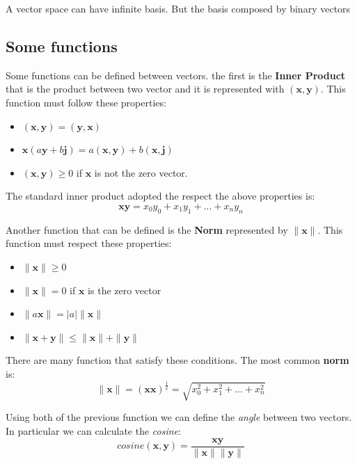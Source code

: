 \documentclass[12pt,a4paper,twoside,openright]{scrbook}
\begin{document}
A vector space can have infinite basis. But the basis composed by binary vectors

\subsection{Some functions}
Some functions can be defined between vectors. the first is the \textbf{Inner Product} that is the product between two vector and it is represented with $(\textbf{x}, \textbf{y})$. This function must follow these properties:
\begin{itemize}
\item $(\textbf{x}, \textbf{y}) = (\textbf{y}, \textbf{x})$ 
\item $\textbf{x} (a \textbf{y} + b \textbf{j}) = a(\textbf{x}, \textbf{y}) + b(\textbf{x}, \textbf{j})$
\item $(\textbf{x}, \textbf{y}) \geq 0$ if $\textbf{x}$ is not the zero vector.
\end{itemize}
The standard inner product adopted the respect the above properties is:
\begin{equation}
\textbf{x}\textbf{y} = x_{0}y_{0} + x_{1}y_{1} + ... + x_{n}y_{n}
\end{equation}

Another function that can be defined is the \textbf{Norm} represented by $\parallel \textbf{x} \parallel$. This function must respect these properties:
\begin{itemize}
\item $\parallel \textbf{x} \parallel \geq 0$
\item $\parallel \textbf{x} \parallel = 0$ if $\textbf{x}$ is the zero vector
\item $\parallel a\textbf{x} \parallel = \mid a \mid \parallel \textbf{x} \parallel$
\item $\parallel \textbf{x} + \textbf{y} \parallel \leq \parallel \textbf{x} \parallel + \parallel \textbf{y} \parallel$
\end{itemize}
There are many function that satisfy these conditions. The most common \textbf{norm} is:
\begin{equation}
\parallel \textbf{x} \parallel = (\textbf{x}\textbf{x})^{\frac{1}{2}} = \sqrt{x_0^2 + x_1^2 + ... + x_n^2}
\end{equation}

Using both of the previous function we can define the \textit{angle} between two vectors. In particular we can calculate the \textit{cosine}:
\begin{equation}
cosine(\textbf{x},\textbf{y}) = \frac{ \textbf{x}\textbf{y}}{\parallel \textbf{x} \parallel \parallel \textbf{y} \parallel}
\end{equation}
 
\end{document}
